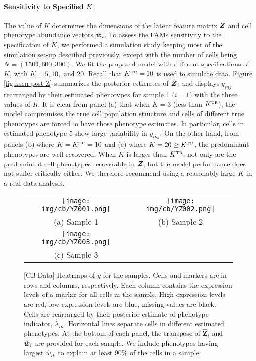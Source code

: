 \documentclass[12pt,]{article}
\def\Z{\bm{Z}}
\newcommand{\true}{{\mbox{\tiny TR}}}
\newcommand{\bZ}{\mbox{\boldmath $Z$}}
\newcommand{\bw}{\mbox{\boldmath $w$}}
\begin{document}
\paragraph*{Sensitivity to Specified $K$}
The value of $K$ determines the dimensions of the latent feature matrix $\bZ$
and cell phenotype abundance vectors $\bw_i$.  To assess the FAMs sensitivity
to the specification of $K$, we performed a simulation study keeping most of
the simulation set-up described previously, except with the number of cells
being $N=(1500, 600, 300)$. We fit the proposed model with different
specifications of $K$, with $K=5, 10, \text{ and } 20$. Recall that
$K^\true=10$ is used to simulate data.  Figure \ref{fig:ksen-post-Z} summarizes
the posterior estimates of $\bZ_i$ and displays $y_{inj}$ rearranged by their
estimated phenotypes for sample 1 ($i=1$) with the three values of $K$. It is
clear from panel (a) that when $K=3$ (less than $K^\true$), the model
compromises the true cell population structure and cells of different true
phenotypes are forced to have those phenotype estimates. In particular, cells
in estimated phenotype 5 show large variability in $y_{inj}$.  On the other
hand, from panels (b) where $K=K^\true=10$ and (c) where $K=20 \geq K^\true$,
the predominant phenotypes are well recovered. 
When $K$ is larger than $K^\true$, not only are the predominant cell phenotypes
recoverable in $\bZ$, but the model performance does not suffer critically
either. We therefore recommend using a reasonably large $K$ in a real data
analysis.

\begin{figure}[th!]
\begin{center}
  \begin{tabular}{cc}
  \texttt{[image: img/cb/YZ001.png]}&
  \texttt{[image: img/cb/YZ002.png]}\\
  (a) Sample 1 & (b) Sample 2 \\
  \texttt{[image: img/cb/YZ003.png]} &\\
  (c) Sample 3 & \\
  \end{tabular}
\end{center}
\vspace{-0.05in}
\caption{[CB Data]  Heatmaps of $y$ for the samples. Cells and markers are in
rows and columns, respectively. Each column contains the expression levels of
a marker for all cells in the sample. High expression levels are red, low
expression levels are blue, missing values are black.   Cells are rearranged
by their posterior estimate of phenotype indicator, $\hat{\lambda}_{in}$.
Horizontal lines separate cells in different estimated phenotypes.
At the bottom of each panel, the transpose of $\hat{\Z}_i$
and $\hat{\bw}_i$ are provided for each sample. We include phenotypes having
largest $\hat{w}_{ik}$ to explain at least 90\% of the cells in a sample.}
\label{fig:cb-post-Z}
\end{figure}
\end{document}

